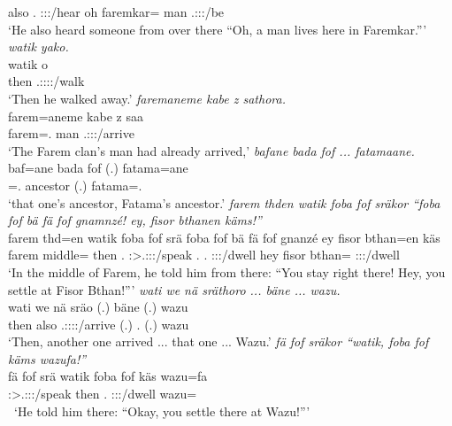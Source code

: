 \begin{exe}
	also \Dist.{\Abl} \Stsg:\Sbj:\Irr:\Pfv/hear oh faremkar={\Loc} man \Tsg.\Masc:\Sbj:\Nonpast:\Ipfv/be\\
	\trans `He also heard someone from over there ``Oh, a man lives here in Faremkar.'''
	\emph{watik yako.}\\
	\gll watik o\\ 
	then \Tsg.\Masc:\Sbj:\Nonpast:\Ipfv:\Andat/walk\\
	\trans `Then he walked away.'
	\emph{faremaneme kabe z sathora.}\\
	\gll farem=aneme kabe z saa\\ 
	farem=\Poss.{\Nsg} man {\Iam} \Tsg.\Masc:\Sbj:\Pst:\Pfv/arrive\\
	\trans `The Farem clan's man had already arrived,'
	\emph{bafane bada fof ... fatamaane.}\\
	\gll baf=ane bada fof (.) fatama=ane\\ 
	\Recog=\Poss.{\Sg} ancestor {\Emph} (.) fatama=\Poss.{\Sg}\\
	\trans `that one's ancestor, Fatama's ancestor.'
	\emph{farem thden watik foba fof sräkor ``foba fof bä fä fof gnamnzé! ey, fisor bthanen käms!''}\\
	\gll farem thd=en watik foba fof srä foba fof bä fä fof gnanzé ey {fisor bthan=en} käs\\ 
	farem middle={\Loc} then \Dist.{\Abl} {\Emph} \Stsg:\Sbj>\Tsg.\Masc:\Obj:\Irr:\Pfv/speak \Dist.{\Abl} {\Emph} \Second.{\Abs} {\Dist} {\Emph} \Ssg:\Sbj:\Imp:\Stat/dwell hey {fisor bthan={\Loc}} \Ssg:\Sbj:\Imp:\Pfv/dwell\\
	\trans `In the middle of Farem, he told him from there: ``You stay right there! Hey, you settle at Fisor Bthan!'''
	\emph{wati we nä sräthoro ... bäne ... wazu.}\\
	\gll wati we nä sräo (.) bäne (.) wazu\\ 
	then also {\Indf} \Tsg.\Masc:\Sbj:\Irr:\Pfv:\Andat/arrive (.) \Recog.{\Abs} (.) wazu\\
	\trans `Then, another one arrived ... that one ... Wazu.'
	\emph{fä fof sräkor ``watik, foba fof käms wazufa!''}\\
	\gll fä fof srä watik foba fof käs wazu=fa\\ 
	{\Dist} {\Emph} \Stsg:\Sbj>\Tsg.\Masc:\Obj:\Irr:\Pfv/speak then \Dist.{\Abl} {\Emph} \Ssg:\Sbj:\Imp:\Pfv/dwell wazu={\Abl}\\\
	\trans `He told him there: ``Okay, you settle there at Wazu!'''

\end{exe}
